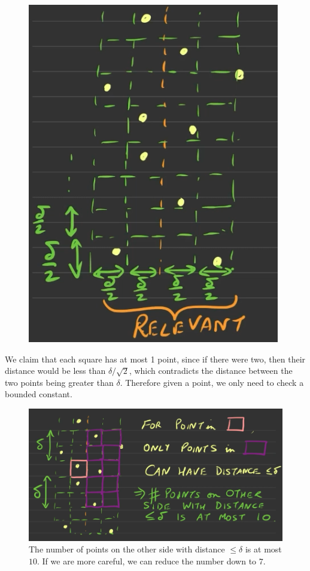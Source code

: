 \documentclass{article}
\begin{document}
    \begin{figure}[H]
      \centering 
      \includegraphics[scale=0.4]{img/cp3.png}
      \caption{} 
      \label{fig:closest_point3}
    \end{figure}

    We claim that each square has at most 1 point, since if there were two, then their distance would be less than $\delta / \sqrt{2}$, which contradicts the distance between the two points being greater than $\delta$. Therefore given a point, we only need to check a bounded constant. 

    \begin{figure}[H]
      \centering 
      \includegraphics[scale=0.4]{img/cp4.png}
      \caption{The number of points on the other side with distance $\leq \delta$ is at most $10$. If we are more careful, we can reduce the number down to $7$. } 
      \label{fig:closest_point4}
    \end{figure}
\end{document}
